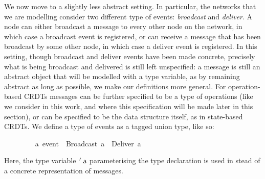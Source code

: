 \documentclass[acmlarge,review,anonymous]{acmart}\settopmatter{printfolios=true}
\begin{document}
We now move to a slightly less abstract setting.
In particular, the networks that we are modelling consider two different type of events: \emph{broadcast} and \emph{deliver}.
A node can either broadcast a message to every other node on the network, in which case a broadcast event is registered, or can receive a message that has been broadcast by some other node, in which case a deliver event is registered.
In this setting, though broadcast and deliver events have been made concrete, precisely what is being broadcast and delivered is still left unspecified: a message is still an abstract object that will be modelled with a type variable, as by remaining abstract as long as possible, we make our definitions more general.
For operation-based CRDTs messages can be further specified to be a type of operations (like we consider in this work, and where this specification will be made later in this section), or can be specified to be the data structure itself, as in state-based CRDTs.
We define a type of events as a tagged union type, like so:
\\
\begin{isabellebody}
\ \ \ \ \ \ \ \  {\isacharprime}a\ event\ {\isacharequal}\ Broadcast\ {\isacharprime}a\ {\isacharbar}\ Deliver\ {\isacharprime}a
\end{isabellebody}
\vspace{\baselineskip}
Here, the type variable $\isacharprime\isa{a}$ parameterising the type declaration is used in stead of a concrete representation of messages.
\end{document}
